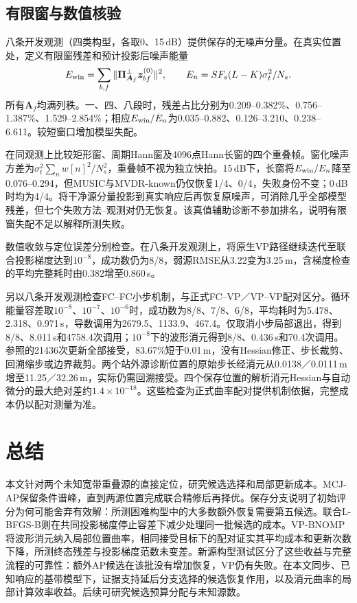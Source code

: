 \documentclass[a4paper,fleqn]{cas-sc}
\begin{document}
\FloatBarrier
\subsection{有限窗与数值核验}
\label{en:windowcheck}
八条开发观测（四类构型，各取0、15\,dB）提供保存的无噪声分量。在真实位置处，定义有限窗残差和预计投影后噪声能量
\begin{equation}
E_{\rm win}=\sum_{b,f}\|\bm\Pi_{\bm A_f}^{\perp}\bm z_{bf}^{(0)}\|^2,
\qquad E_n=SF_s(L-K)\sigma_t^2/N_s.
\end{equation}
所有$\bm A_f$均满列秩。一、四、八段时，残差占比分别为0.209--0.382\%、0.756--1.387\%、1.529--2.854\%；相应$E_{\rm win}/E_n$为0.035--0.882、0.126--3.210、0.238--6.611。较短窗口增加模型失配。

在同观测上比较矩形窗、周期Hann窗及4096点Hann长窗的四个重叠帧。窗化噪声方差为$\sigma_t^2\sum_n w[n]^2/N_s^2$，重叠帧不视为独立快拍。15\,dB下，长窗将$E_{\rm win}/E_n$降至0.076--0.294，但MUSIC与MVDR-known仍仅恢复1/4、0/4，失败身份不变；0\,dB时均为4/4。将干净源分量投影到真实响应后再恢复原噪声，可消除几乎全部模型残差，但七个失败方法--观测对仍无恢复。该真值辅助诊断不参加排名，说明有限窗失配不足以解释所测失败。

\label{en:localchecks}
数值收敛与定位误差分别检查。在八条开发观测上，将原生VP路径继续迭代至联合投影梯度达到$10^{-8}$，成功数仍为8/8，弱源RMSE从3.22变为3.25\,m，含梯度检查的平均完整耗时由0.382增至0.860\,s。

另以八条开发观测检查FC--FC小步机制，与正式FC--VP／VP--VP配对区分。循环能量容差取$10^{-8}$、$10^{-7}$、$10^{-6}$时，成功数为8/8、7/8、6/8，平均耗时为5.478、2.318、0.971\,s，导数调用为2679.5、1133.9、467.4。仅取消小步局部退出，得到8/8、8.011\,s和4758.4次调用；$10^{-8}$下的波形消元得到8/8、0.436\,s和70.4次调用。参照的21436次更新全部接受，83.67\%短于0.01\,m，没有Hessian修正、步长裁剪、回溯缩步或边界裁剪。两个站外源诊断位置的原始步长经消元从0.0138／0.0111\,m增至11.25／32.26\,m，实际仍需回溯接受。四个保存位置的解析消元Hessian与自动微分的最大绝对差约$1.4\times10^{-18}$。这些检查为正式曲率配对提供机制依据，完整成本仍以配对测量为准。

\FloatBarrier
\section{总结}
本文针对两个未知宽带重叠源的直接定位，研究候选选择和局部更新成本。MCJ-AP保留条件谱峰，直到两源位置完成联合精修后再择优。保存分支说明了初始评分为何可能舍弃有效解：所测困难构型中的大多数额外恢复需要第五候选。联合L-BFGS-B则在共同投影梯度停止容差下减少处理同一批候选的成本。VP-BNOMP将波形消元纳入局部位置曲率，相同接受目标下的配对证实其平均成本和更新次数下降，所测终态残差与投影梯度范数未变差。新源构型测试区分了这些收益与完整流程的可靠性：额外AP候选在该批没有增加恢复，VP仍有失败。在本文同步、已知响应的基带模型下，证据支持延后分支选择的候选恢复作用，以及消元曲率的局部计算效率收益。后续可研究候选预算分配与未知源数。
\end{document}
